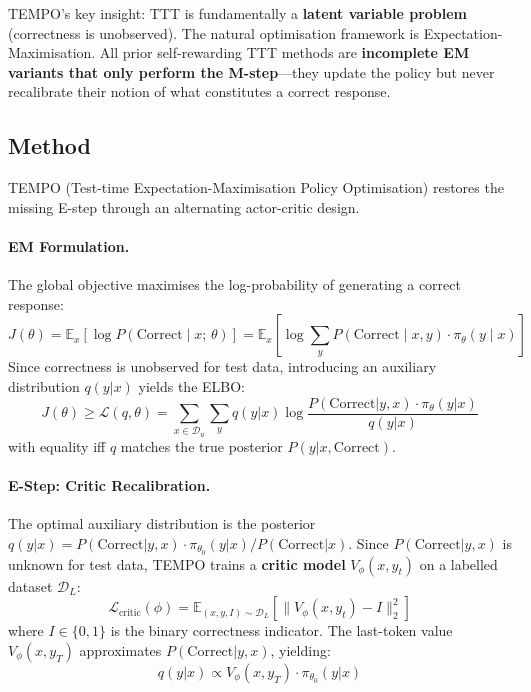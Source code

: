 \documentclass[11pt]{article}
\begin{document}
TEMPO's key insight: TTT is fundamentally a \textbf{latent variable problem} (correctness is unobserved). The natural optimisation framework is Expectation-Maximisation. All prior self-rewarding TTT methods are \textbf{incomplete EM variants that only perform the M-step}---they update the policy but never recalibrate their notion of what constitutes a correct response.

\subsection{Method}

TEMPO (Test-time Expectation-Maximisation Policy Optimisation) restores the missing E-step through an alternating actor-critic design.

\paragraph{EM Formulation.}
The global objective maximises the log-probability of generating a correct response:
\begin{equation}
    J(\theta) = \mathbb{E}_x\!\left[\log P(\mathrm{Correct} \mid x;\, \theta)\right] = \mathbb{E}_x\!\left[\log \sum_y P(\mathrm{Correct} \mid x, y) \cdot \pi_\theta(y \mid x)\right]
\end{equation}
Since correctness is unobserved for test data, introducing an auxiliary distribution $q(y|x)$ yields the ELBO:
\begin{equation}
    J(\theta) \geq \mathcal{L}(q, \theta) = \sum_{x \in \mathcal{D}_u} \sum_y q(y|x) \log \frac{P(\mathrm{Correct}|y,x) \cdot \pi_\theta(y|x)}{q(y|x)}
\end{equation}
with equality iff $q$ matches the true posterior $P(y|x, \mathrm{Correct})$.

\paragraph{E-Step: Critic Recalibration.}
The optimal auxiliary distribution is the posterior $q(y|x) = P(\mathrm{Correct}|y,x) \cdot \pi_{\theta_0}(y|x) / P(\mathrm{Correct}|x)$. Since $P(\mathrm{Correct}|y,x)$ is unknown for test data, TEMPO trains a \textbf{critic model} $V_\phi(x, y_t)$ on a labelled dataset $\mathcal{D}_L$:
\begin{equation}
    \mathcal{L}_{\mathrm{critic}}(\phi) = \mathbb{E}_{(x,y,I) \sim \mathcal{D}_L}\!\left[\|V_\phi(x, y_t) - I\|_2^2\right]
\end{equation}
where $I \in \{0, 1\}$ is the binary correctness indicator. The last-token value $V_\phi(x, y_T)$ approximates $P(\mathrm{Correct}|y,x)$, yielding:
\begin{equation}
    q(y|x) \propto V_\phi(x, y_T) \cdot \pi_{\theta_0}(y|x)
\end{equation}
\end{document}
